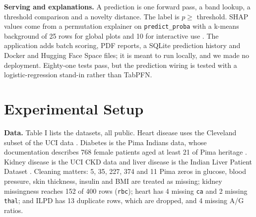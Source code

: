 \documentclass[conference]{IEEEtran}
\begin{document}
\textbf{Serving and explanations.} A prediction is one forward pass, a band lookup, a threshold comparison and a novelty distance. The label is $p \ge$ threshold. SHAP values come from a permutation explainer on \texttt{predict\_proba} with a k-means background of 25 rows for global plots and 10 for interactive use \cite{lundberg2017}. The application adds batch scoring, PDF reports, a SQLite prediction history and Docker and Hugging Face Space files; it is meant to run locally, and we made no deployment. Eighty-one tests pass, but the prediction wiring is tested with a logistic-regression stand-in rather than TabPFN.

\section{Experimental Setup}

\textbf{Data.} Table I lists the datasets, all public. Heart disease uses the Cleveland subset of the UCI data \cite{uci_heart,detrano1989}. Diabetes is the Pima Indians data, whose documentation describes 768 female patients aged at least 21 of Pima heritage \cite{pima_docs}. Kidney disease is the UCI CKD data \cite{uci_ckd} and liver disease is the Indian Liver Patient Dataset \cite{uci_ilpd}. Cleaning matters: 5, 35, 227, 374 and 11 Pima zeros in glucose, blood pressure, skin thickness, insulin and BMI are treated as missing; kidney missingness reaches 152 of 400 rows (\texttt{rbc}); heart has 4 missing \texttt{ca} and 2 missing \texttt{thal}; and ILPD has 13 duplicate rows, which are dropped, and 4 missing A/G ratios.

\begin{table}[!t]
\caption{Datasets after cleaning. Test positives are counted in the shipped 20\% split.}
\label{tab:data}
\centering\footnotesize
{}
\end{table}
\end{document}
